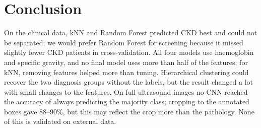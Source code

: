 \section{Conclusion}
On the clinical data, kNN and Random Forest predicted CKD best and could not be separated; we would prefer Random Forest for screening because it missed slightly fewer CKD patients in cross-validation. All four models use haemoglobin and specific gravity, and no final model uses more than half of the features; for kNN, removing features helped more than tuning. Hierarchical clustering could recover the two diagnosis groups without the labels, but the result changed a lot with small changes to the features. On full ultrasound images no CNN reached the accuracy of always predicting the majority class; cropping to the annotated boxes gave 88--90\%, but this may reflect the crop more than the pathology. None of this is validated on external data.
